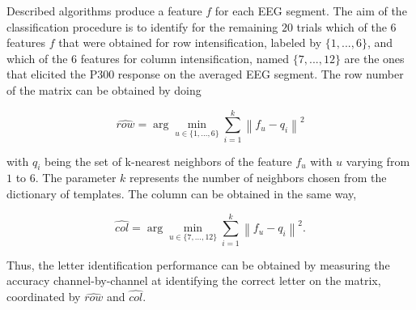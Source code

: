 \documentclass[brainsci,article,submit,moreauthors,pdftex,10pt,a4paper]{mdpi}
\begin{document}
Described algorithms produce a feature $f$ for each EEG segment.  The aim of the classification procedure is to identify for the remaining $20$ trials which of the 6 features $f$ that were obtained for row intensification, labeled by $\{ 1,...,6 \}$, and which of the 6 features for column intensification, named $\{ 7,...,12 \}$ are the ones that elicited the P300 response on the averaged EEG segment. The row number of the matrix can be obtained by doing

\begin{equation}
\hat{row} = \arg \min_{u \in \{1,\dots,6\}} \sum_{i=1}^{k} \left\lVert f_u - q_i \right\rVert ^2
\label{eq:multiclassificationrow}
\end{equation}

\noindent with $q_i$ being the set of k-nearest neighbors of the feature $f_u$ with $u$ varying from $1$ to $6$.  The parameter $k$ represents the number of neighbors chosen from the dictionary of templates.  The column can be obtained in the same way,

\begin{equation}
\hat{col} = \arg \min_{u \in \{7,\dots,12\}} \sum_{i=1}^{k} \left\lVert f_u - q_i \right\rVert ^2.
\label{eq:multiclassificationcol}
\end{equation}

Thus, the letter identification performance can be obtained by measuring the accuracy channel-by-channel at identifying the correct letter on the matrix, coordinated by $ \hat{row} $ and $ \hat{col} $.




\end{document}
